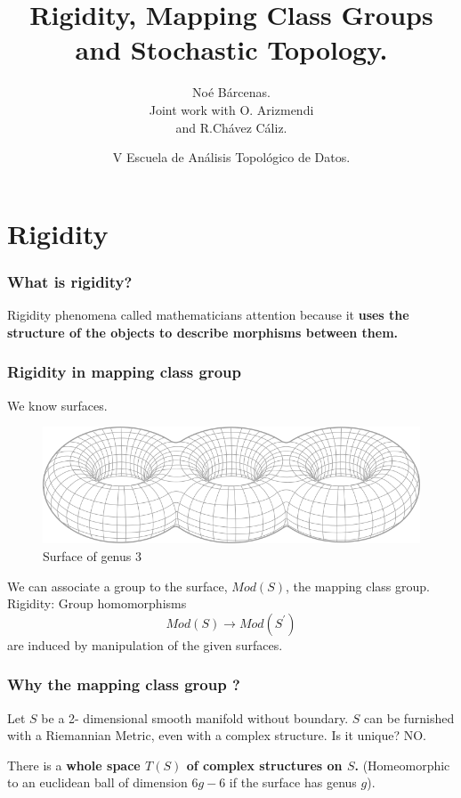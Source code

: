 \documentclass[handout]{beamer}
\title{Rigidity, Mapping  Class Groups  and Stochastic Topology. }
\author{No\'e B\'arcenas.\\ Joint work with O. Arizmendi \\  and R.Ch\'avez C\'aliz.}
\institute{Centro de  Ciencias Matem\'aticas. \\ UNAM. }
\date{V Escuela  de  An\'alisis Topol\'ogico  de  Datos.}
\theoremstyle{plain}
\begin{document}
\begin{frame}
\titlepage
\end{frame}



\section{Rigidity}

\begin{frame}
\frametitle{What  is  rigidity?}

Rigidity phenomena called mathematicians attention because it \textbf{uses the structure of the objects to describe morphisms between them.}

\end{frame}

\begin{frame}
\frametitle{Rigidity in mapping class group}

We know surfaces. \\
\begin{figure}[h!]
	\centering
	\includegraphics[scale=0.35]{CHARLA_STOCHASTIC_TOPOLOGY_MCG_CIMATNOVEMBER_2018/multitorus.png}
	\caption{Surface of genus 3}
\end{figure}

We  can  associate a  group  to the surface, $Mod(S)$,  the  mapping  class  group. \pause
Rigidity: Group  homomorphisms 
$$ Mod(S) \to Mod  (S^{'})$$
are  induced  by  manipulation  of  the  given surfaces. 
\end{frame}


\begin{frame}\frametitle{Why the mapping class group ?}

Let  $S$  be  a 2- dimensional  smooth  manifold without  boundary. \pause
$S$  can  be  furnished  with  a Riemannian  Metric, even with  a  complex structure. \pause Is  it  unique? \pause
NO. \pause 

There  is  a  \textbf{whole  space $T(S)$ of  complex  structures  on  $S$.} \pause (Homeomorphic  to  an  euclidean ball  of  dimension $6g-6$  if  the  surface  has  genus  $g$). \pause 

\end{frame}
\end{document}
